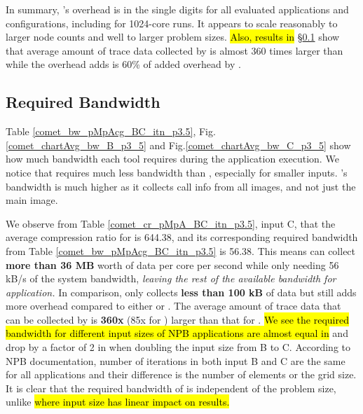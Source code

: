 In summary, \parlot 's overhead is in the single digits for all evaluated applications and configurations, including for 1024-core runs. It appears to scale reasonably to larger node counts and well to larger problem sizes.\hl{ Also, results in} \S\ref{subsec:lowbw} show that average amount of trace data collected by \parlota is almost 360 times larger than \callgrind while the overhead \parlota adds is 60\% of added overhead by \callgrind.

  
\subsection{Required Bandwidth}
\label{subsec:lowbw}



Table \ref{comet_bw_pMpAcg_BC_itn_p3.5}, Fig.  \ref{comet_chartAvg_bw_B_p3_5} and Fig.\ref{comet_chartAvg_bw_C_p3_5} show how much bandwidth each tool 
requires
during the application execution. 
%
We notice that \parlotm requires much less bandwidth than
\callgrind, especially for smaller inputs. 
%
\parlota's bandwidth is much higher as it collects call info from all
images, and not just the main image.


We observe from Table \ref{comet_cr_pMpA_BC_itn_p3.5}, input C, that the
average compression ratio for \parlota is 644.38, and its
corresponding required bandwidth from Table
\ref{comet_bw_pMpAcg_BC_itn_p3.5} is 56.38.
%
This means \parlot can
collect \textbf{more than 36 MB} worth of data per core per second
while only needing 56 kB/s of the system bandwidth, {\em leaving the rest of the available bandwidth for application.}
%
In comparison, \callgrind only
collects \textbf{less than 100 kB} of data but still adds more
overhead compared to either \parlota or \parlotm . 
%
The average amount of trace data that can be collected by \parlota is
\textbf{360x} (85x for \parlotm) larger than that for \callgrind.
%
\hl{We see the required bandwidth for different input sizes of NPB applications are almost equal in }\parlot and drop by a factor of 2 in \callgrind when doubling the input size from B to C. According to NPB documentation, number of iterations in both input B and C are the same for all applications and their difference is the number of elements or the grid size. It is clear that the required bandwidth of \parlot is independent of the problem size, unlike \callgrind\hl{ where input size has linear impact on results.}
%








